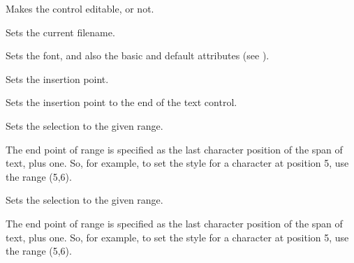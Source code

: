 \label{wxrichtextctrlseteditable}


Makes the control editable, or not.

\label{wxrichtextctrlsetfilename}


Sets the current filename.

\label{wxrichtextctrlsetfont}


Sets the font, and also the basic and default attributes (see ).

\label{wxrichtextctrlsetinsertionpoint}


Sets the insertion point.

\label{wxrichtextctrlsetinsertionpointend}


Sets the insertion point to the end of the text control.

\label{wxrichtextctrlsetselection}


Sets the selection to the given range.

The end point of range is specified as the last character position of the span of text, plus one.
So, for example, to set the style for a character at position 5, use the range (5,6).

\label{wxrichtextctrlsetselectionrange}


Sets the selection to the given range.

The end point of range is specified as the last character position of the span of text, plus one.
So, for example, to set the style for a character at position 5, use the range (5,6).

